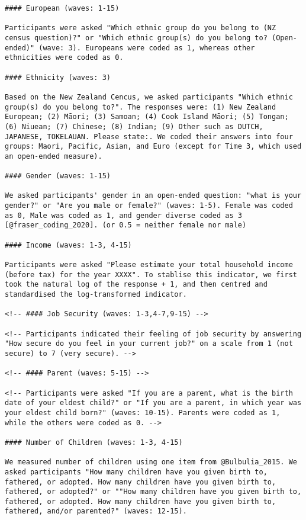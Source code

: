 \documentclass[
  singlecolumn]{article}
\begin{document}
\begin{verbatim}
#### European (waves: 1-15)

Participants were asked "Which ethnic group do you belong to (NZ census question)?" or "Which ethnic group(s) do you belong to? (Open-ended)" (wave: 3). Europeans were coded as 1, whereas other ethnicities were coded as 0.

#### Ethnicity (waves: 3)

Based on the New Zealand Cencus, we asked participants "Which ethnic group(s) do you belong to?". The responses were: (1) New Zealand European; (2) Māori; (3) Samoan; (4) Cook Island Māori; (5) Tongan; (6) Niuean; (7) Chinese; (8) Indian; (9) Other such as DUTCH, JAPANESE, TOKELAUAN. Please state:. We coded their answers into four groups: Maori, Pacific, Asian, and Euro (except for Time 3, which used an open-ended measure).

#### Gender (waves: 1-15)

We asked participants' gender in an open-ended question: "what is your gender?" or "Are you male or female?" (waves: 1-5). Female was coded as 0, Male was coded as 1, and gender diverse coded as 3 [@fraser_coding_2020]. (or 0.5 = neither female nor male)

#### Income (waves: 1-3, 4-15)

Participants were asked "Please estimate your total household income (before tax) for the year XXXX". To stablise this indicator, we first took the natural log of the response + 1, and then centred and standardised the log-transformed indicator.

<!-- #### Job Security (waves: 1-3,4-7,9-15) -->

<!-- Participants indicated their feeling of job security by answering "How secure do you feel in your current job?" on a scale from 1 (not secure) to 7 (very secure). -->

<!-- #### Parent (waves: 5-15) -->

<!-- Participants were asked "If you are a parent, what is the birth date of your eldest child?" or "If you are a parent, in which year was your eldest child born?" (waves: 10-15). Parents were coded as 1, while the others were coded as 0. -->

#### Number of Children (waves: 1-3, 4-15)

We measured number of children using one item from @Bulbulia_2015. We asked participants "How many children have you given birth to, fathered, or adopted. How many children have you given birth to, fathered, or adopted?" or ""How many children have you given birth to, fathered, or adopted. How many children have you given birth to, fathered, and/or parented?" (waves: 12-15).


\end{verbatim}
\end{document}
